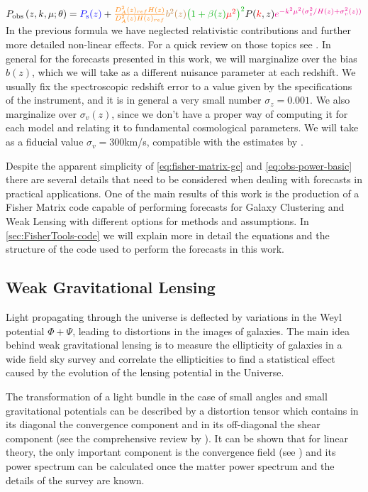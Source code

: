 \beeq$\label{eq:obs-power-basic}
P_{{\rm obs}}\left(z,k,\mu;\theta\right)=\textcolor{blue}{P_{{\rm s}}(z)}+{\color{orange}\frac{D_{A}^{2}(z)_{ref}H(z)}{D_{A}^{2}(z)H(z)_{ref}}}
{\color{brown}b^{2}(z)}
{\color{green}\left(1+\beta(z){\color{red}\mu}^{{\color{red}2}}\right)^{2}}P({\color{red}k},z){\color{magenta}e^{-k^{2}\mu^{2}(\sigma_{z}^{2}/H(z)+\sigma_{v}^{2}(z))}}
$
In the previous formula we have neglected relativistic contributions and further more detailed non-linear effects.
For a quick review on those topics see \cite{durrer, bonvin, taruya, scoccimarro}.
In general for the forecasts presented in this work,
we will marginalize over the bias $b(z)$, which we will take as a different nuisance parameter at each redshift. We usually fix
the spectroscopic redshift error  to a value given by the specifications of the instrument, and it is in general a very small number
$\sigma_{z}=0.001$. We also marginalize over $\sigma_{v}(z)$, 
since we don't have a proper way of computing it for each model and relating it to fundamental cosmological parameters.
We will take as a fiducial value $\sigma_{v} = 300$km/s, compatible with the estimates by \cite{de_la_torre_modelling_2012}.

Despite the apparent 
simplicity of \cref{eq:fisher-matrix-gc} and \cref{eq:obs-power-basic} there
are several details that need to be considered when dealing with forecasts
in practical applications. 
One of the main results of this work is the production of a Fisher Matrix code capable of performing
forecasts for Galaxy Clustering and Weak Lensing with different options for methods and assumptions.
In \cref{sec:FisherTools-code} we will explain more in detail the equations and the structure of the code
used to perform the forecasts in this work.


\subsection{Weak Gravitational Lensing \label{sub:Weak-Lensing-Fisher}}

Light propagating through the universe is deflected by variations in the Weyl potential $\Phi+\Psi$,
leading to distortions in the images of galaxies. 
The main idea behind weak gravitational lensing is to measure the ellipticity of galaxies in a 
wide field sky survey and correlate the ellipticities to find a statistical effect caused by the
evolution of the lensing potential in the Universe.

The transformation of a light bundle in the case of small angles and small gravitational potentials
can be described by a distortion tensor which contains in its diagonal the convergence component and in its
off-diagonal the shear component (see the comprehensive review by \cite{cite Bartelmann Schneider}).
It can be shown that for linear theory, the only important component is the convergence field (see \cite{Amendola, Tegmark, Hu, Bartelmann}) 
and its power spectrum can be calculated once the matter power spectrum and the
details of the survey are known.

